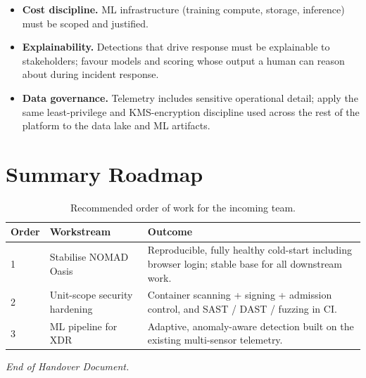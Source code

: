 \documentclass[11pt,a4paper]{report}
\begin{document}
\begin{itemize}[leftmargin=*]
    \item \textbf{Cost discipline.} ML infrastructure (training compute,
          storage, inference) must be scoped and justified.
    \item \textbf{Explainability.} Detections that drive response must be
          explainable to stakeholders; favour models and scoring whose output a human
          can reason about during incident response.
    \item \textbf{Data governance.} Telemetry includes sensitive operational
          detail; apply the same least-privilege and KMS-encryption discipline used
          across the rest of the platform to the data lake and ML artifacts.
\end{itemize}

\noindent{}

\chapter{Summary Roadmap}

\begin{table}[H]
    \centering
    \renewcommand{\arraystretch}{1.4}
    \begin{tabular}{@{}p{1.2cm}p{4.5cm}p{8cm}@{}}
        \toprule
        \textbf{Order} & \textbf{Workstream} & \textbf{Outcome} \\
        \midrule
        1 & Stabilise NOMAD Oasis & Reproducible, fully healthy cold-start
            including browser login; stable base for all downstream work. \\
        2 & Unit-scope security hardening & Container scanning + signing +
            admission control, and SAST / DAST / fuzzing in CI. \\
        3 & ML pipeline for XDR & Adaptive, anomaly-aware detection built on the
            existing multi-sensor telemetry. \\
        \bottomrule
    \end{tabular}
    \caption{Recommended order of work for the incoming team.}
\end{table}

\vspace{1cm}
\begin{center}
    {\color{primary}\itshape End of Handover Document.}
\end{center}
\end{document}
